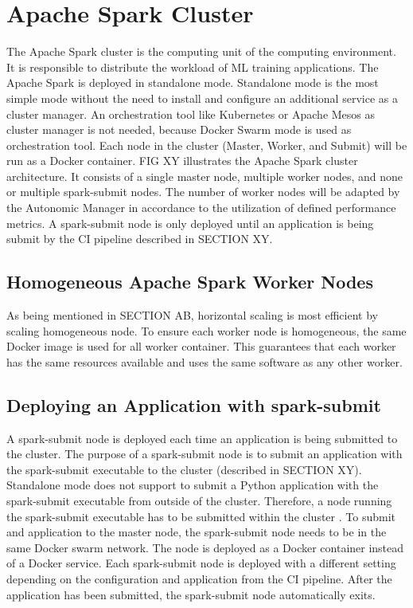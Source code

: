 \section{Apache Spark Cluster}
\label{sec:05_spark}
The Apache Spark cluster is the computing unit of the computing environment. It is responsible to distribute the workload of ML training applications.
The Apache Spark is deployed in standalone mode. Standalone mode is the most simple mode without the need to install and configure an additional service as a cluster manager. An orchestration tool like Kubernetes or Apache Mesos as cluster manager is not needed, because Docker Swarm mode is used as orchestration tool.
Each node in the cluster (Master, Worker, and Submit) will be run as a Docker container.
FIG XY illustrates the Apache Spark cluster architecture. It consists of a single master node, multiple worker nodes, and none or multiple spark-submit nodes.
The number of worker nodes will be adapted by the Autonomic Manager in accordance to the utilization of defined performance metrics.
A spark-submit node is only deployed until an application is being submit by the CI pipeline described in SECTION XY.


\subsection{Homogeneous Apache Spark Worker Nodes}
As being mentioned in SECTION AB, horizontal scaling is most efficient by scaling homogeneous node.
To ensure each worker node is homogeneous, the same Docker image is used for all worker container.
This guarantees that each worker has the same resources available and uses the same software as any other worker.


\subsection{Deploying an Application with spark-submit}
A spark-submit node is deployed each time an application is being submitted to the cluster.
The purpose of a spark-submit node is to submit an application with the spark-submit executable to the cluster (described in SECTION XY).
Standalone mode does not support to submit a Python application with the spark-submit executable from outside of the cluster. Therefore, a node running the spark-submit executable has to be submitted within the cluster \cite{Apache2020Spark}.
To submit and application to the master node, the spark-submit node needs to be in the same Docker swarm network. The node is deployed as a Docker container instead of a Docker service. Each spark-submit node is deployed with a different setting depending on the configuration and application from the CI pipeline.
After the application has been submitted, the spark-submit node automatically exits.

